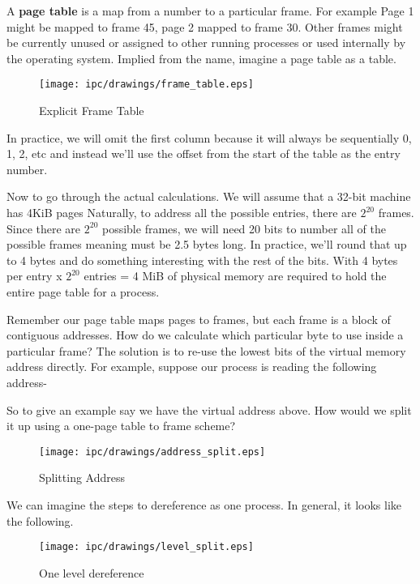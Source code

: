 	A \textbf{page table} is a map from a number to a particular frame.
	For example Page 1 might be mapped to frame 45, page 2 mapped to frame 30.
	Other frames might be currently unused or assigned to other running processes or used internally by the operating system.
	Implied from the name, imagine a page table as a table.
	 
	\begin{figure}[H]
	 \centering
	 \texttt{[image: ipc/drawings/frame\_table.eps]}
	 \caption{Explicit Frame Table}
	\end{figure}
	 
	In practice, we will omit the first column because it will always be sequentially 0, 1, 2, etc and instead we'll use the offset from the start of the table as the entry number.
	 
	Now to go through the actual calculations.
	We will assume that a 32-bit machine has 4KiB pages
	Naturally, to address all the possible entries, there are $2^{20}$ frames.
	Since there are $2^{20}$ possible frames, we will need 20 bits to number all of the possible frames meaning  must be 2.5 bytes long.
	In practice, we'll round that up to 4 bytes and do something interesting with the rest of the bits.
	With 4 bytes per entry x $2^{20}$ entries = 4 MiB of physical memory are required to hold the entire page table for a process.
	 
	Remember our page table maps pages to frames, but each frame is a block of contiguous addresses.
	How do we calculate which particular byte to use inside a particular frame?
	The solution is to re-use the lowest bits of the virtual memory address directly.
	For example, suppose our process is reading the following address- 
	 
	So to give an example say we have the virtual address above.
	How would we split it up using a one-page table to frame scheme?
	 
	\begin{figure}[H]
	\centering
	\texttt{[image: ipc/drawings/address\_split.eps]}
	\caption{Splitting Address}
	\end{figure}
	 
	We can imagine the steps to dereference as one process.
	In general, it looks like the following.
	 
	\begin{figure}[H]
	 \centering
	 \texttt{[image: ipc/drawings/level\_split.eps]}
	 \caption{One level dereference}
	\end{figure}
	 
